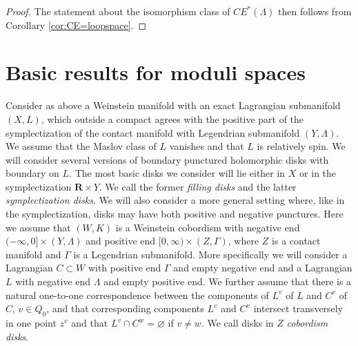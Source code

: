 \documentclass{gtpart}
\renewcommand{\R}{\mathbf{R}}
\begin{document}
\begin{proof}
	The statement about the isomorphism class of $CE^{\ast}(\Lambda)$ then follows from Corollary \ref{cor:CE=loopspace}.
\end{proof}



\appendix

\section{Basic results for moduli spaces}\label{sec:mdlispaces}
Consider as above a Weinstein manifold with an exact Lagrangian submanifold $(X,L)$, which outside a
compact agrees with the positive part of the symplectization of the contact manifold with Legendrian
submanifold $(Y,\Lambda)$. We assume that the Maslov class of $L$ vanishes and that $L$ is relatively spin. We will consider several versions of boundary punctured holomorphic disks
with boundary on $L$. The most basic disks we consider will lie either in $X$ or in the
symplectization $\R\times Y$. We call the former \emph{filling disks} and the latter
\emph{symplectization disks}. We will also consider a more general setting where, like in the
symplectization, disks may have both positive and negative punctures. Here we assume that $(W,K)$ is
a Weinstein cobordism with negative end $(-\infty,0]\times (Y,\Lambda)$ and positive end
$[0,\infty)\times(Z,\Gamma)$, where $Z$ is a contact manifold and $\Gamma$ is a Legendrian
submanifold. More specifically we will consider a Lagrangian $C\subset W$ with positive end $\Gamma$
and empty negative end and a Lagrangian $L$ with negative end $\Lambda$ and empty positive end. We
further assume that there is a natural one-to-one correspondence between the components of $L^{v}$ of $L$ and $C^{v}$ of $C$, $v\in Q_{0}$, and that corresponding components $L^{v}$ and $C^{v}$ intersect transversely in one point $z^{v}$ and that $L^{v}\cap C^{w}=\varnothing$ if $v\ne w$. We call disks in $Z$ \emph{cobordism disks}.
\end{document}
